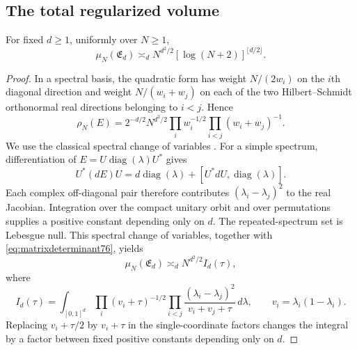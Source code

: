 \subsection{The total regularized volume}
\begin{proposition}\label{prop:matrixvolume76}
For fixed $d\ge1$, uniformly over $N\ge1$,
\begin{equation}\label{eq:matrixvolume76}
 \mu_N(\mathfrak E_d)
       \asymp_d N^{d^2/2}[\log(N+2)]^{\lfloor d/2\rfloor}.
\end{equation}
\end{proposition}
\begin{proof}
In a spectral basis, the quadratic form has weight $N/(2w_i)$ on
the $i$th diagonal direction and weight $N/(w_i+w_j)$ on each of
the two Hilbert--Schmidt orthonormal real directions belonging to
$i<j$. Hence
\begin{equation}\label{eq:matrixdeterminant76}
 \rho_N(E)=2^{-d/2}N^{d^2/2}
       \prod_iw_i^{-1/2}\prod_{i<j}(w_i+w_j)^{-1}.
\end{equation}
We use the classical spectral change of variables
\cite{SZGeom76}. For a simple spectrum, differentiation of
$E=U\operatorname{diag}(\lambda)U^*$ gives
\[
 U^*(dE)U=d\operatorname{diag}(\lambda)
       +[U^*dU,\operatorname{diag}(\lambda)].
\]
Each complex off-diagonal pair therefore contributes
$(\lambda_i-\lambda_j)^2$ to the real Jacobian. Integration over
the compact unitary orbit and over permutations supplies a positive
constant depending only on $d$. The repeated-spectrum set is
Lebesgue null. This spectral change of variables, together with
\eqref{eq:matrixdeterminant76}, yields
\begin{equation}\label{eq:matrixspectralintegral76}
 \mu_N(\mathfrak E_d)\asymp_d N^{d^2/2}I_d(\tau),
\end{equation}
where
\begin{equation}\label{eq:matrixId76}
 I_d(\tau)=\int_{[0,1]^d}
 \prod_i(v_i+\tau)^{-1/2}
 \prod_{i<j}\frac{(\lambda_i-\lambda_j)^2}{v_i+v_j+\tau}
 \,d\lambda,\qquad v_i=\lambda_i(1-\lambda_i).
\end{equation}
Replacing $v_i+\tau/2$ by $v_i+\tau$ in the single-coordinate
factors changes the integral by a factor between fixed positive
constants depending only on $d$.


\end{proof}
